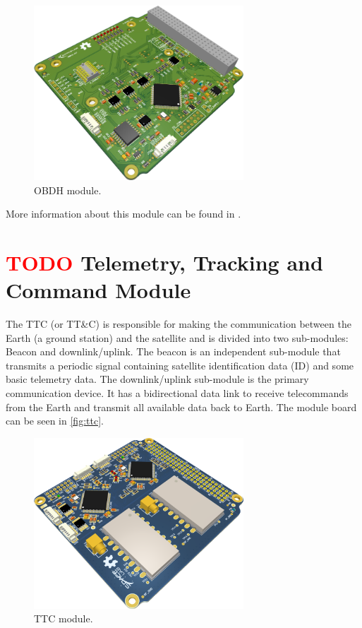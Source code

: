 \begin{figure}[!ht]
    \begin{center}
        \includegraphics[width=0.7\textwidth]{figures/subsystems/obdh2-pcb-3d}
        \caption{OBDH module.}
        \label{fig:obdh2}
    \end{center}
\end{figure}

More information about this module can be found in \cite{obdh2}.

\section{ \textcolor{red}{TODO} Telemetry, Tracking and Command Module}

The TTC (or TT\&C) is responsible for making the communication between the Earth (a ground station) and the satellite and is divided into two sub-modules: Beacon and downlink/uplink. The beacon is an independent sub-module that transmits a periodic signal containing satellite identification data (ID) and some basic telemetry data. The downlink/uplink sub-module is the primary communication device. It has a bidirectional data link to receive telecommands from the Earth and transmit all available data back to Earth. The module board can be seen in \autoref{fig:ttc}.

\begin{figure}[!ht]
    \begin{center}
        \includegraphics[width=0.7\textwidth]{figures/subsystems/ttc2_pcb_3d}
        \caption{TTC module.}
        \label{fig:ttc}
    \end{center}
\end{figure}

